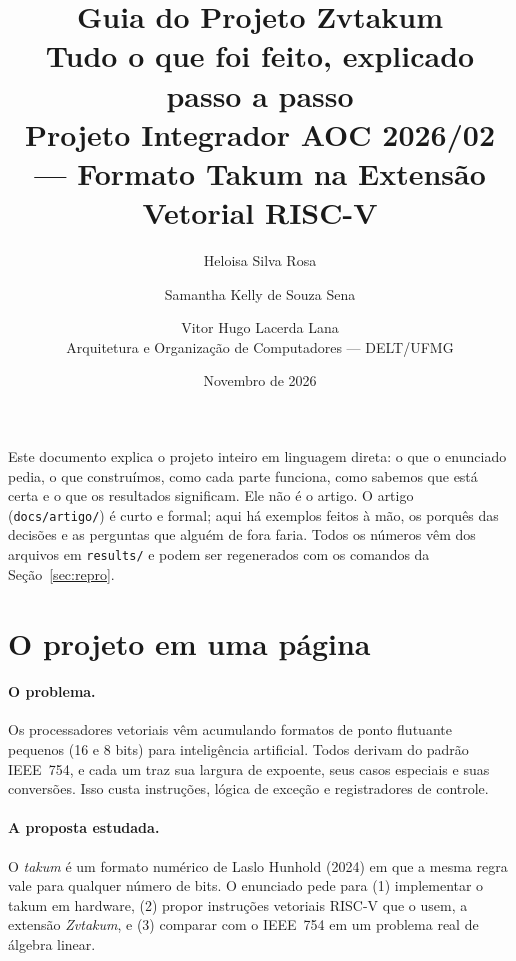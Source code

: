 \documentclass[11pt,a4paper]{article}
\title{\textbf{Guia do Projeto Zvtakum}\\[4pt]
\large Tudo o que foi feito, explicado passo a passo\\[2pt]
\normalsize Projeto Integrador AOC 2026/02 --- Formato Takum na Extensão Vetorial RISC-V}
\author{Heloisa Silva Rosa \and Samantha Kelly de Souza Sena \and Vitor Hugo Lacerda Lana\\[4pt]
  \small Arquitetura e Organização de Computadores --- DELT/UFMG}
\date{Novembro de 2026}
\newcommand{\code}[1]{\texttt{#1}}
\begin{document}
\maketitle

\noindent Este documento explica o projeto inteiro em linguagem direta: o que o enunciado pedia, o que
construímos, como cada parte funciona, como sabemos que está certa e o que os resultados significam.
Ele não é o artigo. O artigo (\code{docs/artigo/}) é curto e formal; aqui há exemplos feitos à mão, os
porquês das decisões e as perguntas que alguém de fora faria. Todos os números vêm dos arquivos em
\code{results/} e podem ser regenerados com os comandos da Seção~\ref{sec:repro}.

\tableofcontents

\section{O projeto em uma página}

\paragraph{O problema.} Os processadores vetoriais vêm acumulando formatos de ponto flutuante pequenos
(16 e 8 bits) para inteligência artificial. Todos derivam do padrão IEEE~754, e cada um traz sua largura
de expoente, seus casos especiais e suas conversões. Isso custa instruções, lógica de exceção e
registradores de controle.

\paragraph{A proposta estudada.} O \emph{takum} é um formato numérico de Laslo Hunhold (2024) em que a
mesma regra vale para qualquer número de bits. O enunciado pede para (1) implementar o takum em hardware,
(2) propor instruções vetoriais RISC-V que o usem, a extensão \emph{Zvtakum}, e (3) comparar com o
IEEE~754 em um problema real de álgebra linear.
\end{document}
